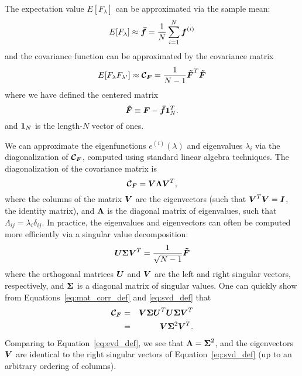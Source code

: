 The expectation value $E[F_\lambda]$ can be approximated via the sample mean:
\begin{equation}
  E[F_\lambda] \approx \boldsymbol{\bar{f}}
  = \frac{1}{N} \sum_{i=1}^N \boldsymbol{f}^{(i)}
\end{equation}
and the covariance function can be approximated by the covariance matrix
\begin{equation}
  \label{eq:mat_corr_def}
  E[F_\lambda F_{\lambda^\prime}] \approx 
  \boldsymbol{\mathcal{C}_F} = \frac{1}{N - 1} \boldsymbol{\tilde{F}}^T \boldsymbol{\tilde{F}}
\end{equation}
where we have defined the centered matrix
\begin{equation}
  \boldsymbol{\tilde{F}} \equiv \boldsymbol{F} - \boldsymbol{\bar{f}}\boldsymbol{1}_N^T.
\end{equation}
and $\boldsymbol{1}_N$ is the length-$N$ vector of ones.

We can approximate the eigenfunctions $e^{(i)}(\lambda)$ and
eigenvalues $\lambda_i$ via the diagonalization 
of $\boldsymbol{\mathcal{C}_F}$, computed using standard linear algebra techniques.
The diagonalization of the covariance matrix is
\begin{equation}
  \label{eq:evd_def}
  \boldsymbol{\mathcal{C}_F} = \boldsymbol{V}\boldsymbol{\Lambda}\boldsymbol{V}^T,
\end{equation}
where the columns of the matrix $\boldsymbol{V}$ are the eigenvectors
(such that $\boldsymbol{V}^T \boldsymbol{V} = \boldsymbol{I}$, the identity matrix), and
$\boldsymbol{\Lambda}$ is the diagonal matrix of eigenvalues, such that
$\Lambda_{ij} = \lambda_i\delta_{ij}$.  In practice, the eigenvalues and
eigenvectors can often be computed more efficiently via a singular value
decomposition:
\begin{equation}
  \label{eq:svd_def}
  \boldsymbol{U}\boldsymbol{\Sigma}\boldsymbol{V}^T
  = \frac{1}{\sqrt{N - 1}}\boldsymbol{\tilde{F}}
\end{equation}
where the orthogonal matrices $\boldsymbol{U}$ and $\boldsymbol{V}$ are the left and
right singular vectors, respectively, and $\boldsymbol{\Sigma}$ is a diagonal matrix
of singular values.  One can quickly show from Equations~\ref{eq:mat_corr_def}
and \ref{eq:svd_def} that
\begin{eqnarray}
  \boldsymbol{\mathcal{C}_F}
  &=& \boldsymbol{V}\boldsymbol{\Sigma}\boldsymbol{U}^T
  \boldsymbol{U}\boldsymbol{\Sigma}\boldsymbol{V}^T\nonumber\\
  &=& \boldsymbol{V}\boldsymbol{\Sigma}^2\boldsymbol{V}^T.
\end{eqnarray}
Comparing to Equation~\ref{eq:evd_def}, we see that 
$\boldsymbol{\Lambda} = \boldsymbol{\Sigma}^2$, and the eigenvectors $\boldsymbol{V}$ are
identical to the right singular vectors of Equation~\ref{eq:svd_def}
(up to an arbitrary ordering of columns).

